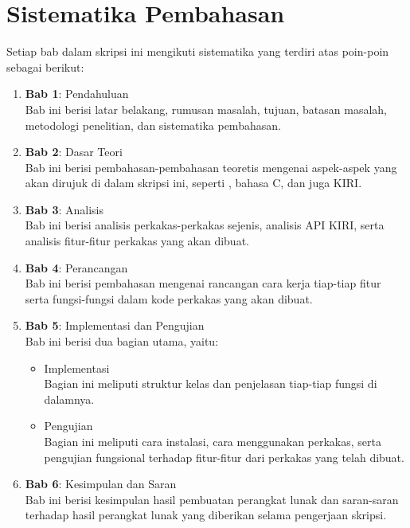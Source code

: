 \section{Sistematika Pembahasan}
\label{sec:sispem}
Setiap bab dalam skripsi ini mengikuti sistematika yang terdiri atas poin-poin sebagai berikut:
\begin{enumerate}
	\item \textbf{Bab 1}: Pendahuluan \\
	Bab ini berisi latar belakang, rumusan masalah, tujuan, batasan masalah, metodologi \mbox{penelitian}, dan sistematika pembahasan.
	\item \textbf{Bab 2}: Dasar Teori \\
	Bab ini berisi pembahasan-pembahasan teoretis mengenai aspek-aspek yang akan dirujuk di dalam skripsi ini, seperti \cl, bahasa C, dan juga KIRI.
	\item \textbf{Bab 3}: Analisis \\
	Bab ini berisi analisis perkakas-perkakas sejenis, analisis API KIRI, serta analisis fitur-fitur perkakas yang akan dibuat.
	\item \textbf{Bab 4}: Perancangan \\
	Bab ini berisi pembahasan mengenai rancangan cara kerja tiap-tiap fitur serta fungsi-fungsi dalam kode perkakas yang akan dibuat.
	\item \textbf{Bab 5}: Implementasi dan Pengujian \\
	Bab ini berisi dua bagian utama, yaitu:
	
	\begin{itemize}
		\item Implementasi \\
		Bagian ini meliputi struktur kelas dan penjelasan tiap-tiap fungsi di dalamnya.
		\item Pengujian \\
		Bagian ini meliputi cara instalasi, cara menggunakan perkakas, serta pengujian fungsional terhadap fitur-fitur dari perkakas yang telah dibuat.
	\end{itemize}
	
	\item \textbf{Bab 6}: Kesimpulan dan Saran \\
	Bab ini berisi kesimpulan hasil pembuatan perangkat lunak dan saran-saran terhadap hasil perangkat lunak yang diberikan selama pengerjaan skripsi.
\end{enumerate}
